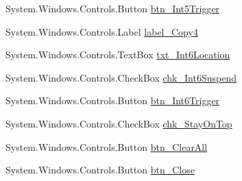 \begin{DoxyCompactItemize}
\item 
System.\+Windows.\+Controls.\+Button \hyperlink{class_c_p_u___o_s___simulator_1_1_interrupts_window_a69a42b8c4d51f888a40603b83264dc0f}{btn\+\_\+\+Int5\+Trigger}
\item 
System.\+Windows.\+Controls.\+Label \hyperlink{class_c_p_u___o_s___simulator_1_1_interrupts_window_ad1b975745fe9a61da3de1f80d0dcf902}{label\+\_\+\+Copy4}
\item 
System.\+Windows.\+Controls.\+Text\+Box \hyperlink{class_c_p_u___o_s___simulator_1_1_interrupts_window_a3622031e734f3b4fef38625509650396}{txt\+\_\+\+Int6\+Location}
\item 
System.\+Windows.\+Controls.\+Check\+Box \hyperlink{class_c_p_u___o_s___simulator_1_1_interrupts_window_a2f420903e0b66225d706e8b2e9b151ec}{chk\+\_\+\+Int6\+Suspend}
\item 
System.\+Windows.\+Controls.\+Button \hyperlink{class_c_p_u___o_s___simulator_1_1_interrupts_window_a40f87b0cde439b851823b9f37c5e8adf}{btn\+\_\+\+Int6\+Trigger}
\item 
System.\+Windows.\+Controls.\+Check\+Box \hyperlink{class_c_p_u___o_s___simulator_1_1_interrupts_window_a519c337aaab394e65246e0ce275f2c89}{chk\+\_\+\+Stay\+On\+Top}
\item 
System.\+Windows.\+Controls.\+Button \hyperlink{class_c_p_u___o_s___simulator_1_1_interrupts_window_a8f223a8f23c46f19a53078b2ac268eb6}{btn\+\_\+\+Clear\+All}
\item 
System.\+Windows.\+Controls.\+Button \hyperlink{class_c_p_u___o_s___simulator_1_1_interrupts_window_a512827c37bc7fa8dce0f1b78c901fab4}{btn\+\_\+\+Close}
\end{DoxyCompactItemize}
